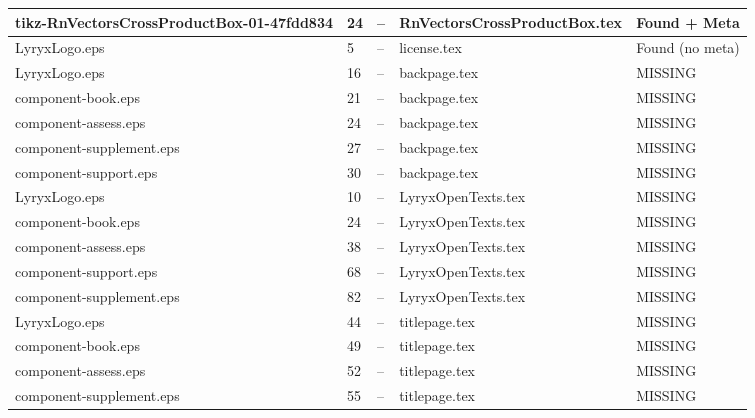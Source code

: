 \documentclass[11pt]{article}
\begin{document}
\begin{longtable}{|p{3.5cm}|p{1.5cm}|p{1cm}|p{4cm}|p{2cm}|}
tikz-RnVectorsCrossProductBox-01-47fdd834 & 24 & -- & RnVectorsCrossProductBox.tex & \textcolor{found}{Found + Meta} \\
\hline

LyryxLogo.eps & 5 & -- & license.tex & \textcolor{warning}{Found (no meta)} \\
\hline

LyryxLogo.eps & 16 & -- & backpage.tex & \textcolor{missing}{MISSING} \\
\hline

component-book.eps & 21 & -- & backpage.tex & \textcolor{missing}{MISSING} \\
\hline

component-assess.eps & 24 & -- & backpage.tex & \textcolor{missing}{MISSING} \\
\hline

component-supplement.eps & 27 & -- & backpage.tex & \textcolor{missing}{MISSING} \\
\hline

component-support.eps & 30 & -- & backpage.tex & \textcolor{missing}{MISSING} \\
\hline

LyryxLogo.eps & 10 & -- & LyryxOpenTexts.tex & \textcolor{missing}{MISSING} \\
\hline

component-book.eps & 24 & -- & LyryxOpenTexts.tex & \textcolor{missing}{MISSING} \\
\hline

component-assess.eps & 38 & -- & LyryxOpenTexts.tex & \textcolor{missing}{MISSING} \\
\hline

component-support.eps & 68 & -- & LyryxOpenTexts.tex & \textcolor{missing}{MISSING} \\
\hline

component-supplement.eps & 82 & -- & LyryxOpenTexts.tex & \textcolor{missing}{MISSING} \\
\hline

LyryxLogo.eps & 44 & -- & titlepage.tex & \textcolor{missing}{MISSING} \\
\hline

component-book.eps & 49 & -- & titlepage.tex & \textcolor{missing}{MISSING} \\
\hline

component-assess.eps & 52 & -- & titlepage.tex & \textcolor{missing}{MISSING} \\
\hline

component-supplement.eps & 55 & -- & titlepage.tex & \textcolor{missing}{MISSING} \\
\hline


\end{longtable}
\end{document}
